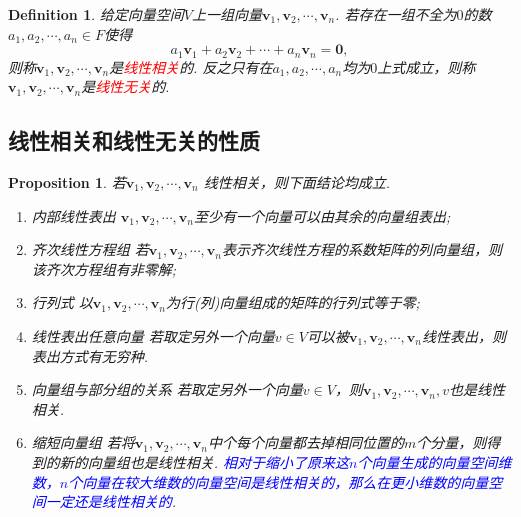 \documentclass{article}
\newtheorem{proposition}[theorem]{Proposition}
\newtheorem{definition}[theorem]{Definition}
\newcommand{\mbf}[1]{\bm{#1}}
\newcommand{\redt}[1]{\textcolor{red}{#1}}
\newcommand{\bluet}[1]{\textcolor{blue}{#1}}
\begin{document}
\begin{definition}
\rm 给定向量空间$V$上一组向量$\mbf{v}_1,\mbf{v}_2,\cdots,\mbf{v}_n$. 若存在一组不全为$0$的数$a_1, a_2, \cdots, a_n \in F$使得
$$
a_1\mbf{v}_1 + a_2\mbf{v}_2 + \cdots + a_n\mbf{v}_n = \mbf{0},
$$
则称$\mbf{v}_1,\mbf{v}_2,\cdots,\mbf{v}_n$是\redt{线性相关}的. 反之只有在$a_1, a_2, \cdots, a_n$均为$0$上式成立，则称$\mbf{v}_1,\mbf{v}_2,\cdots,\mbf{v}_n$是\redt{线性无关}的.
\end{definition}

\newpage
\subsection{线性相关和线性无关的性质}

\begin{proposition}
\rm 若$\mbf{v}_1,\mbf{v}_2,\cdots,\mbf{v}_n$ {\color{red}线性相关}，则下面结论均成立.
\begin{enumerate}
	\item {\color{red} 内部线性表出} $\mbf{v}_1,\mbf{v}_2,\cdots,\mbf{v}_n$至少有一个向量可以由其余的向量组表出;
	\item {\color{red} 齐次线性方程组} 若$\mbf{v}_1,\mbf{v}_2,\cdots,\mbf{v}_n$表示齐次线性方程的系数矩阵的列向量组，则该齐次方程组有非零解;
	\item {\color{red} 行列式} 以$\mbf{v}_1,\mbf{v}_2,\cdots,\mbf{v}_n$为行(列)向量组成的矩阵的行列式等于零;
	\item {\color{red} 线性表出任意向量} 若取定另外一个向量$v \in V$可以被$\mbf{v}_1,\mbf{v}_2,\cdots,\mbf{v}_n$线性表出，则表出方式有无穷种.
	\item {\color{red} 向量组与部分组的关系} 若取定另外一个向量$v \in V$，则$\mbf{v}_1,\mbf{v}_2,\cdots,\mbf{v}_n, v$也是线性相关.
	\item {\color{red} 缩短向量组} 若将$\mbf{v}_1,\mbf{v}_2,\cdots,\mbf{v}_n$中个每个向量都去掉相同位置的$m$个分量，则得到的新的向量组也是线性相关. \bluet{相对于缩小了原来这$n$个向量生成的向量空间维数，$n$个向量在较大维数的向量空间是线性相关的，那么在更小维数的向量空间一定还是线性相关的}.
\end{enumerate}
\end{proposition}
\end{document}
